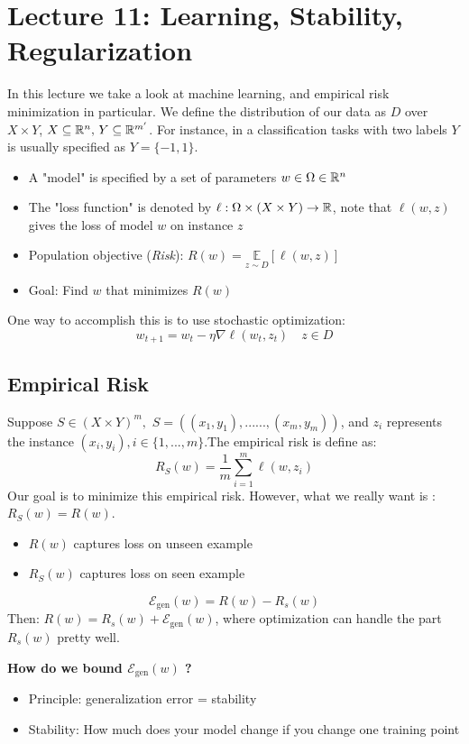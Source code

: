 \section{Lecture 11: Learning, Stability, Regularization
}

In this lecture we take a look at machine learning, and empirical risk minimization in particular. We define the distribution of our data as $D$ over $X\times Y$, $X\subseteq \mathbb{R}^{n}, \,Y \subseteq \mathbb{R}^{m^{\prime}}$. For instance, in a classification tasks with two labels $Y$ is usually specified as $ Y = \{ -1,1 \}$.
\begin{itemize}
\item A "model" is specified by a set of parameters $w \in \Omega \in \mathbb{R}^{n}$
\item The "loss function" is denoted by $\ell: \Omega \times (X\times Y) \rightarrow \mathbb{R}$, note that $\ell(w,z)$ gives the loss of model $w$ on instance $z$
\item Population objective (\textit{Risk}): $R(w)=\underset{z\sim D}{\mathbb{E}}[\ell(w,z)]$
\item Goal: Find $w$ that minimizes $R(w)$
\end{itemize}

One way to accomplish this is to use stochastic optimization:
$$w_{t+1} = w_{t} - \eta \nabla \ell(w_t,z_t) \quad z\in D $$
\subsection{Empirical Risk}
Suppose $S\in (X \times Y)^{m}, \,\, S=((x_1,y_1),......,(x_m,y_m))$, and $z_i$ represents the instance $(x_i,y_i), i\in \{1, ...,m \}$.The empirical risk is define as:
$$R_{S}(w) = \frac{1}{m}\sum_{i=1}^{m}\ell(w,z_i)$$
Our goal is to minimize this empirical risk. However, what we really want is : $R_{S}(w) = R(w)$.
\begin{itemize}
\item $R(w)$ captures loss on unseen example 
\item $R_S(w)$ captures loss on seen example
\end{itemize}
\begin{definition}
$$\mathcal{E}_{\text{gen}}(w) = R(w) - R_{s}(w)$$
Then: $R(w) = R_{s}(w) + \mathcal{E}_{\text{gen}}(w)$, where optimization can handle the part $R_{s}(w)$ pretty well.
\end{definition}
\textbf{How do we bound $\mathcal{E}_{\text{gen}}(w)$ ?}
\begin{itemize}
\item Principle: generalization error = stability
\item Stability: How much does your model change if you change one training point
\end{itemize}

